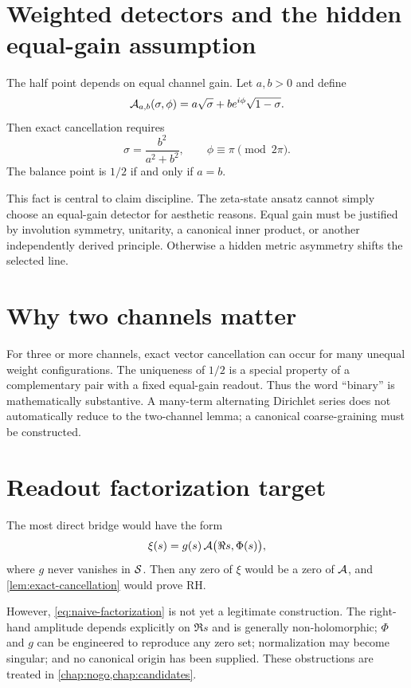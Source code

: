 \section{Weighted detectors and the hidden equal-gain assumption}

The half point depends on equal channel gain. Let $a,b>0$ and define
\begin{equation}
 \mathcal{A}_{a,b}(\sigma,\phi)
 =a\sqrt\sigma+b e^{i\phi}\sqrt{1-\sigma}.
 \label{eq:weighted-amplitude}
\end{equation}
Then exact cancellation requires
\begin{equation}
 \sigma=\frac{b^2}{a^2+b^2},
 \qquad \phi\equiv\pi\pmod{2\pi}.
 \label{eq:weighted-balance}
\end{equation}
The balance point is $1/2$ if and only if $a=b$.

This fact is central to claim discipline. The zeta-state ansatz cannot simply choose an equal-gain detector for aesthetic reasons. Equal gain must be justified by involution symmetry, unitarity, a canonical inner product, or another independently derived principle. Otherwise a hidden metric asymmetry shifts the selected line.

\section{Why two channels matter}

For three or more channels, exact vector cancellation can occur for many unequal weight configurations. The uniqueness of $1/2$ is a special property of a complementary pair with a fixed equal-gain readout. Thus the word ``binary'' is mathematically substantive. A many-term alternating Dirichlet series does not automatically reduce to the two-channel lemma; a canonical coarse-graining must be constructed.

\section{Readout factorization target}

The most direct bridge would have the form
\begin{equation}
 \xi(s)=g(s)\,\mathcal{A}\bigl(\Re s,\Phi(s)\bigr),
 \label{eq:naive-factorization}
\end{equation}
where $g$ never vanishes in $\mathcal{S}$. Then any zero of $\xi$ would be a zero of $\mathcal{A}$, and \cref{lem:exact-cancellation} would prove RH.

However, \cref{eq:naive-factorization} is not yet a legitimate construction. The right-hand amplitude depends explicitly on $\Re s$ and is generally non-holomorphic; $\Phi$ and $g$ can be engineered to reproduce any zero set; normalization may become singular; and no canonical origin has been supplied. These obstructions are treated in \cref{chap:nogo,chap:candidates}.

